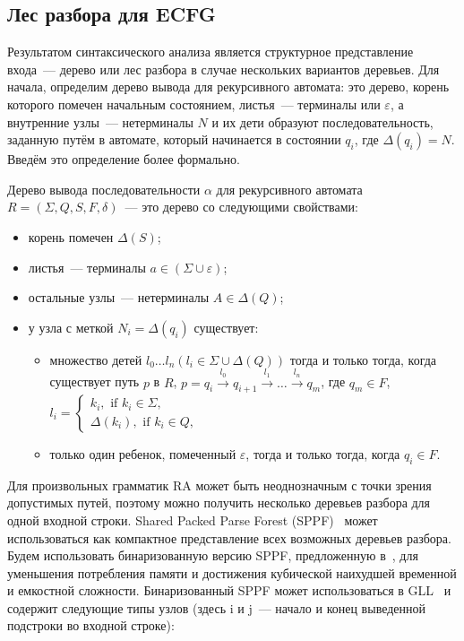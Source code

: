 \subsection{Лес разбора для ECFG}
Результатом синтаксического анализа является структурное представление 
входа~--- дерево или лес разбора в случае нескольких вариантов деревьев.
Для начала, определим дерево вывода для рекурсивного автомата: 
это дерево, корень которого помечен начальным состоянием, листья~--- терминалы или $\varepsilon$,
а внутренние узлы~--- нетерминалы $N$ и их
дети образуют последовательность, заданную путём в автомате, который начинается в 
состоянии $q_i$, где $ \Delta(q_i) = N $. Введём это определение более формально.

\begin{mydef}
	
	Дерево вывода последовательности $\alpha$ для рекурсивного автомата $R=(\Sigma, Q, S, F, \delta)$~--- это дерево со следующими свойствами:
	
	\begin{itemize}
		\item корень помечен $\Delta(S)$;
		\item листья~--- терминалы $a\in (\Sigma \cup \varepsilon)$;
		\item остальные узлы~--- нетерминалы $A\in \Delta(Q)$;
		\item у узла с меткой $N_i = \Delta(q_i)$ существует:
		\begin{itemize}
			\item 
			множество детей $l_0 \dots l_n (l_i \in \Sigma \cup \Delta(Q))$ тогда и только тогда,
			когда существует путь $p$ в $R$, \mbox{$p = q_i \xrightarrow[]{l_0} q_{i+1} \xrightarrow[]{l_1} \dots \xrightarrow{l_n} q_m$}, где
			$q_m \in F$, \mbox{$l_i = 
			\left\{
			\begin{matrix}
			k_i, \text{ if } k_i \in \Sigma,\\
			\Delta(k_i), \text{ if } k_i \in Q,
			\end{matrix}
			\right.
			$}
			\item только один ребенок, помеченный $\varepsilon$, тогда и только тогда,
			когда $ q_i \in F $.
		\end{itemize}
	\end{itemize}
\end{mydef}
Для произвольных грамматик RA может быть неоднозначным с точки зрения допустимых путей,
поэтому можно получить несколько деревьев разбора для одной входной строки.
Shared Packed Parse Forest (SPPF)~\cite{SPPFa} может использоваться как компактное
представление всех возможных деревьев разбора. Будем использовать бинаризованную версию SPPF,
предложенную в~\cite{brnglr}, для уменьшения потребления памяти и достижения кубической
наихудшей временной и емкостной сложности. Бинаризованный SPPF может использоваться
в GLL~\cite{scott2013gll} и содержит следующие типы узлов (здесь i и j~--- начало и конец выведенной подстроки во входной строке):

